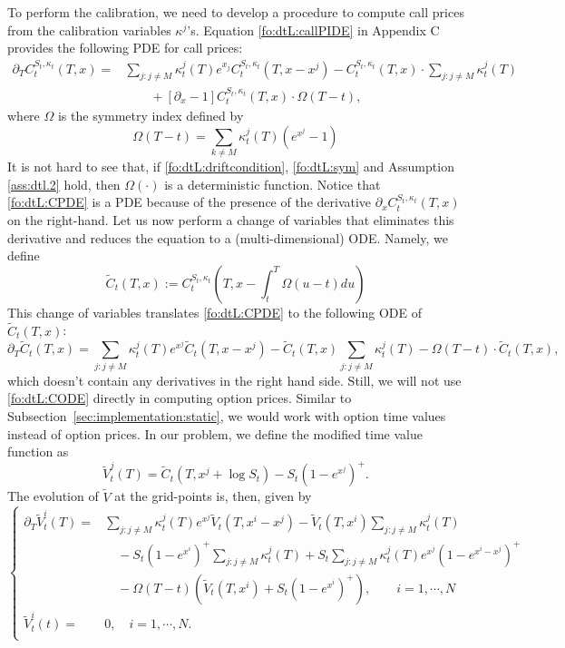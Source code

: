 \documentclass{article}
\numberwithin{equation}{section}
\def\tC{\tilde{C}}
\def\tV{\tilde{V}}
\begin{document}
To perform the calibration, we need to develop a procedure to compute call prices from the calibration variables $\kappa^j$'s. Equation \eqref{fo:dtL:callPIDE} in Appendix C provides the following PDE for call prices: 
\begin{align} \label{fo:dtL:CPDE}
\partial_{T} C^{S_t,\kappa_t}_t(T,x)= & \underset{j:j\neq M}\sum \kappa_t^j(T) e^{x_j} C^{S_t,\kappa_t}_t(T,x-x^j) - C^{S_t,\kappa_t}_t(T,x) \cdot \underset{j:j\neq M}\sum \kappa_t^j(T) \nonumber \\
& \qquad + [\partial_x -1]C^{S_t,\kappa_t}_t(T,x) \cdot \Omega(T-t),
\end{align}
where $\Omega$ is the symmetry index defined by 
\begin{equation}\label{eq.dtl.kappasym}
\Omega(T-t) = \sum_{k\neq M} \kappa^j_t(T) \left(e^{x^j}-1\right)
\end{equation}
It is not hard to see that, if \eqref{fo:dtL:driftcondition}, \eqref{fo:dtL:sym} and Assumption \ref{ass:dtl.2} hold, then $\Omega(\cdot)$ is a deterministic function.
Notice that \eqref{fo:dtL:CPDE} is a PDE because of the presence of the derivative $\partial_x C^{S_t,\kappa_t}_t(T,x)$ on the right-hand. Let us now perform a change of variables that eliminates this derivative and reduces the equation to a (multi-dimensional) ODE. Namely, we define
\begin{equation}
\tilde{C}_t(T,x) := C^{S_t,\kappa_t}_t\left(T,x - \int_t^T \Omega(u-t) du\right)
\end{equation}
This change of variables translates \eqref{fo:dtL:CPDE} to the following ODE of $\tC_t(T,x)$:
\begin{equation}\label{fo:dtL:CODE}
\partial_T \tC_t(T,x) = \underset{j:j\neq M}\sum \kappa_t^j(T) e^{x^j} \tC_t(T,x-x^j) -  \tC_t(T,x)\underset{j:j\neq M}\sum \kappa^j_t(T) - \Omega(T-t) \cdot \tC_t(T,x),
\end{equation}
which doesn't contain any derivatives in the right hand side.
Still, we will not use \eqref{fo:dtL:CODE} directly in computing option prices. Similar to Subsection~\ref{sec:implementation:static}, we would work with option time values instead of option prices. 
In our problem, we define the modified time value function as
\begin{equation}
\tV^j_t(T) = \tC_t(T,x^j+\log S_t) - S_t(1-e^{x^j})^+.
\end{equation}
The evolution of $\tV$ at the grid-points is, then, given by
\begin{equation}\label{fo:dtL:VPIDE}
\left\{
\begin{aligned}
\partial_T \tV^i_t(T) = & \underset{j:j\neq M}\sum \kappa_t^j(T) e^{x^j} \tV_t(T,x^i-x^j) - \tV_t(T, x^i)\underset{j:j\neq M}\sum \kappa_t^j(T) \\
& \quad -S_t (1-e^{x^i})^+\underset{j:j\neq M}\sum \kappa_t^j(T) + S_t \underset{j:j\neq M}\sum \kappa_t^j(T) e^{x^j} (1-e^{x^i-x^j})^+ \\
& \quad - \Omega(T-t) \left(\tV_t(T,x^i) + S_t (1-e^{x^i})^+ \right), \quad \quad i = 1,\cdots,N\\
\tV^i_t(t) = & 0, \quad i= 1,\cdots,N.\\
\end{aligned}
\right.
\end{equation}
\end{document}

